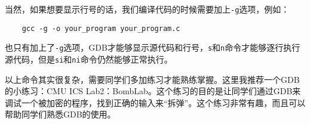 \documentclass[../main.tex]{subfiles}
\begin{document}
当然，如果想要显示行号的话，我们编译代码的时候需要加上\texttt{-g}选项，例如：
\begin{verbatim}
    gcc -g -o your_program your_program.c
\end{verbatim}
也只有加上了\texttt{-g}选项，GDB才能够显示源代码和行号，\texttt{s}和\texttt{n}命令才能够逐行执行源代码，但是\texttt{si}和\texttt{ni}命令仍然能够正常执行。

以上命令其实很复杂，需要同学们多加练习才能熟练掌握。这里我推荐一个GDB的小练习：CMU ICS Lab2：BombLab。这个练习的目的是让同学们通过GDB来调试一个被加密的程序，找到正确的输入来“拆弹”。这个练习非常有趣，而且可以帮助同学们熟悉GDB的使用。
\end{document}
